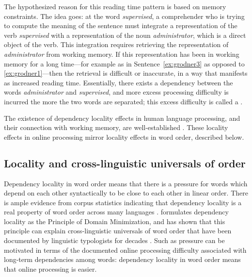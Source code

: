 The hypothesized reason for this reading time pattern is based on memory constraints. The idea goes: at the word \emph{supervised}, a comprehender who is trying to compute the meaning of the sentence must integrate a representation of the verb \emph{supervised} with a representation of the noun \emph{administrator}, which is a direct object of the verb. This integration requires retrieving the representation of \emph{administrator} from working memory. If this representation has been in working memory for a long time---for example as in Sentence~\ref{ex:grodner3} as opposed to \ref{ex:grodner1}---then the retrieval is difficult or inaccurate, in a way that manifests as increased reading time. Essentially, there exists a dependency between the words \emph{administrator} and \emph{supervised}, and more excess processing difficulty is incurred the more the two words are separated; this excess difficulty is called a .

The existence of dependency locality effects in human language processing, and their connection with working memory, are well-established \citep{fedorenko2013direct}. These locality effects in online processing mirror locality effects in word order, described below.



\subsection{Locality and cross-linguistic universals of order}

Dependency locality in word order means that there is a pressure for words which depend on each other syntactically to be close to each other in linear order.
There is ample evidence from corpus statistics indicating that dependency locality is a real property of word order across many languages \citep{gildea-optimizing-2007,liu2008dependency,gildea-grammars-2010,futrell-large-scale-2015,liu-dependency-2017,temperley-minimizing-2018}. 
\citet{hawkins-performance-1994,hawkins-efficiency-2003} formulates dependency locality as the Principle of Domain Minimization, and has shown that this principle can explain cross-linguistic universals of word order that have been documented by linguistic typologists for decades \citep{greenberg-universals-1963}. 
Such as pressure can be motivated in terms of the documented online processing difficulty associated with long-term dependencies among words: dependency locality in word order means that online processing is easier.

